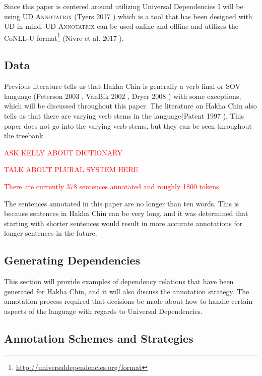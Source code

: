 \documentclass[10pt, a4paper]{article}
\begin{document}
Since this paper is centered around utilizing Universal Dependencies I will be using UD \textsc{Annotatrix} (Tyers 2017 \cite{tyers2017annotation}) which is a tool that has been designed with UD in mind. UD \textsc{Annotatrix} can be used online and offline and utilizes the CoNLL-U format\footnote{\url{http://universaldependencies.org/format}} (Nivre et al. 2017 \cite{nivre2017universal}). 

\subsection{Data}
\label{sec:data}

Previous literature tells us that Hakha Chin is generally a verb-final or SOV language (Peterson 2003 \cite{Peterson-2003}, VanBik 2002 \cite{vanbik2002three}, Dryer 2008 \cite{dryer2008word}) with some exceptions, which will be discussed throughout this paper. The literature on Hakha Chin also tells us that there are varying verb stems in the language(Patent 1997 \cite{patent1997lai}). This paper does not go into the varying verb stems, but they can be seen throughout the treebank. 

\textcolor{red}{ASK KELLY ABOUT DICTIONARY}

\textcolor{red}{TALK ABOUT PLURAL SYSTEM HERE}

\textcolor{red}{There are currently 378 sentences annotated and roughly 1800 tokens}

The sentences annotated in this paper are no longer than ten words. This is because sentences in Hakha Chin can be very long, and it was determined that starting with shorter sentences would result in more accurate annotations for longer sentences in the future. 

\subsection{Generating Dependencies}
\label{sec:HCDep}

This section will provide examples of dependency relations that have been generated for Hakha Chin, and it will also discuss the annotation strategy. The annotation process required that decisions be made about how to handle certain aspects of the language with regards to Universal Dependencies.

\subsection{Annotation Schemes and Strategies}
\label{sec:schemes}
\end{document}
